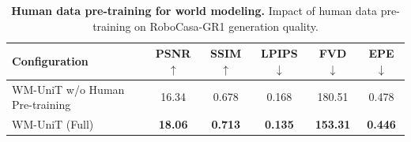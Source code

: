 \begin{table}[t]
  \caption{\textbf{Human data pre-training for world modeling.} Impact of human data pre-training on RoboCasa-GR1 generation quality.}
  \label{tab:wm-human-pretrain}
  \centering
  \begin{tabular}{lccccc}
    \toprule
    Configuration & PSNR $\uparrow$ & SSIM $\uparrow$ & LPIPS $\downarrow$ & FVD $\downarrow$ & EPE $\downarrow$ \\
    \midrule
    WM-UniT w/o Human Pre-training & 16.34 & 0.678 & 0.168 & 180.51 & 0.478 \\
    WM-UniT (Full)             & \textbf{18.06} & \textbf{0.713} & \textbf{0.135} & \textbf{153.31} & \textbf{0.446} \\
    \bottomrule
  \end{tabular}
\end{table}
